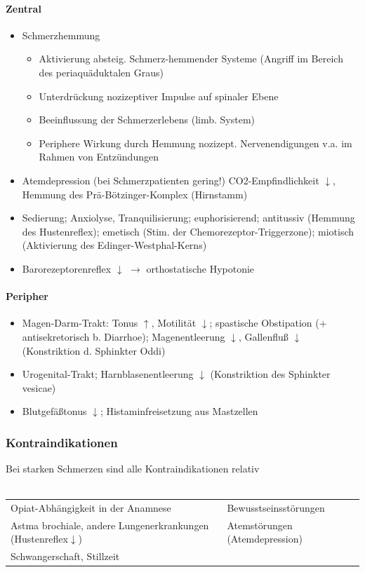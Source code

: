 \documentclass[10pt,a4paper]{report}
\begin{document}
\paragraph{Zentral} %
\label{subp:zentral}
\begin{itemize}
	\item Schmerzhemmung
	\begin{itemize}
		\item Aktivierung absteig. Schmerz-hemmender Systeme (Angriff im Bereich des periaquäduktalen Graus)
		\item Unterdrückung nozizeptiver Impulse auf spinaler Ebene
		\item Beeinflussung der Schmerzerlebens (limb. System)
		\item Periphere Wirkung durch Hemmung nozizept. Nervenendigungen v.a. im  Rahmen von Entzündungen
	\end{itemize}
	\item Atemdepression (bei Schmerzpatienten gering!) CO2-Empfindlichkeit $\downarrow$,  Hemmung des Prä-Bötzinger-Komplex (Hirnstamm)
	\item Sedierung; Anxiolyse, Tranquilisierung; 	euphorisierend; antitussiv (Hemmung des Hustenreflex); emetisch (Stim. der Chemorezeptor-Triggerzone); miotisch (Aktivierung des Edinger-Westphal-Kerns)
	\item Barorezeptorenreflex $\downarrow$ $\rightarrow$ orthostatische Hypotonie
\end{itemize}
\paragraph{Peripher} %
\label{subp:peripher}
\begin{itemize}
	\item Magen-Darm-Trakt: Tonus $\uparrow$, Motilität $\downarrow$; spastische Obstipation (+ antisekretorisch b. Diarrhoe); Magenentleerung $\downarrow$, Gallenfluß $\downarrow$ (Konstriktion d. Sphinkter Oddi)
	\item Urogenital-Trakt; Harnblasenentleerung $\downarrow$ (Konstriktion des Sphinkter vesicae)
	\item Blutgefäßtonus $\downarrow$; Histaminfreisetzung aus Mastzellen
\end{itemize}
\subsubsection{Kontraindikationen} %
\label{par:kontraindikationen}
Bei starken Schmerzen sind alle Kontraindikationen relativ\\\\
\begin{tabularx}{\textwidth}{X|X}
Opiat-Abhängigkeit in der Anamnese&Bewusstseinsstörungen\\
Astma brochiale, andere Lungenerkrankungen (Hustenreflex$\downarrow$)&Atemstörungen (Atemdepression)\\
Schwangerschaft, Stillzeit&\\
\end{tabularx}
\end{document}

